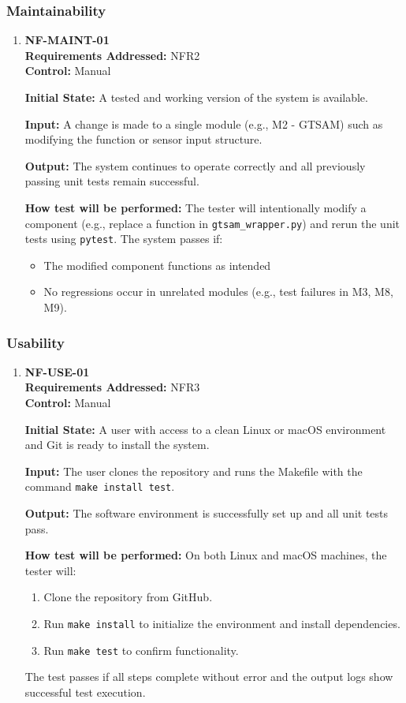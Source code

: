\documentclass[12pt, titlepage]{article}
\begin{document}
\subsubsection{Maintainability}
\begin{enumerate}
  \item \textbf{NF-MAINT-01}  \\
  \textbf{Requirements Addressed:} NFR2 \\
  \textbf{Control:} Manual
  
  \textbf{Initial State:} A tested and working version of the system is available.
  
  \textbf{Input:} A change is made to a single module (e.g., M2 - GTSAM) such as modifying the function or sensor input structure.
  
  \textbf{Output:} The system continues to operate correctly and all previously passing unit tests remain successful.
  
  \textbf{How test will be performed:}  
  The tester will intentionally modify a component (e.g., replace a function in \texttt{gtsam\_wrapper.py}) and rerun the unit tests using \texttt{pytest}. The system passes if:  
  \begin{itemize}
      \item The modified component functions as intended 
      \item No regressions occur in unrelated modules (e.g., test failures in M3, M8, M9).
  \end{itemize}
\end{enumerate}

\subsubsection{Usability}
\begin{enumerate}
  \item \textbf{NF-USE-01}  \\
  \textbf{Requirements Addressed:} NFR3 \\
  \textbf{Control:} Manual

  \textbf{Initial State:} A user with access to a clean Linux or macOS environment and Git is ready to install the system.

  \textbf{Input:} The user clones the repository and runs the Makefile with the command \texttt{make install test}.

  \textbf{Output:} The software environment is successfully set up and all unit tests pass.

  \textbf{How test will be performed:}  
  On both Linux and macOS machines, the tester will:  
  \begin{enumerate}
      \item Clone the repository from GitHub.  
      \item Run \texttt{make install} to initialize the environment and install dependencies.  
      \item Run \texttt{make test} to confirm functionality.  
  \end{enumerate}
  The test passes if all steps complete without error and the output logs show successful test execution.
\end{enumerate}
\end{document}
